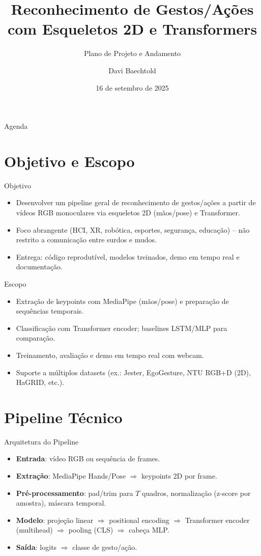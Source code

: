 \documentclass[aspectratio=169]{beamer}
\title{Reconhecimento de Gestos/Ações com Esqueletos 2D e Transformers}
\subtitle{Plano de Projeto e Andamento}
\author{Davi Baechtold}
\institute{PUCPR}
\date{16 de setembro de 2025}
\begin{document}
\begin{frame}
  \titlepage
\end{frame}

\begin{frame}{Agenda}
  \tableofcontents
\end{frame}

\section{Objetivo e Escopo}
\begin{frame}{Objetivo}
  \begin{itemize}
    \item Desenvolver um pipeline geral de reconhecimento de gestos/ações a partir de vídeos RGB monoculares via esqueletos 2D (mãos/pose) e Transformer.
    \item Foco abrangente (HCI, XR, robótica, esportes, segurança, educação) – não restrito a comunicação entre surdos e mudos.
    \item Entrega: código reprodutível, modelos treinados, demo em tempo real e documentação.
  \end{itemize}
\end{frame}

\begin{frame}{Escopo}
  \begin{itemize}
    \item Extração de keypoints com MediaPipe (mãos/pose) e preparação de sequências temporais.
    \item Classificação com Transformer encoder; baselines LSTM/MLP para comparação.
    \item Treinamento, avaliação e demo em tempo real com webcam.
    \item Suporte a múltiplos datasets (ex.: Jester, EgoGesture, NTU RGB+D (2D), HaGRID, etc.).
  \end{itemize}
\end{frame}

\section{Pipeline Técnico}
\begin{frame}{Arquitetura do Pipeline}
  \begin{itemize}
    \item \textbf{Entrada}: vídeo RGB ou sequência de frames.
    \item \textbf{Extração}: MediaPipe Hands/Pose $\Rightarrow$ keypoints 2D por frame.
    \item \textbf{Pré-processamento}: pad/trim para $T$ quadros, normalização (z-score por amostra), máscara temporal.
  \item \textbf{Modelo}: projeção linear $\Rightarrow$ positional encoding $\Rightarrow$ Transformer encoder (multihead) $\Rightarrow$ pooling (CLS) $\Rightarrow$ cabeça MLP.
    \item \textbf{Saída}: logits $\Rightarrow$ classe de gesto/ação.
  \end{itemize}
\end{frame}
\end{document}
